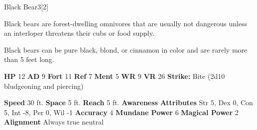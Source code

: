       
  \begin{monsubsection}{Black Bear}{3}[2]
    \vspace{-1em}\vspace{-1em}
    \vspace{0em}

    
        Black bears are forest-dwelling omnivores that are usually not dangerous unless an interloper threatens their cubs or food supply.

        Black bears can be pure black, blond, or cinnamon in color and are rarely more than 5 feet long.
      
    

    \begin{spellcontent}
      \begin{spelltargetinginfo}
        \pari \textbf{HP} 12 \monsep
          \textbf{AD} 9 \monsep
          \textbf{Fort} 11 \monsep
          \textbf{Ref} 7 \monsep
          \textbf{Ment} 5
        \pari \textbf{WR} 9 \monsep
        \textbf{VR} 26
        \pari \textbf{Strike:}
            Bite  (2d10 bludgeoning and piercing)
      \end{spelltargetinginfo}
    \end{spellcontent}
    \begin{monsterfooter}
      \pari \textbf{Speed} 30 ft. \monsep
        \textbf{Space} 5 ft. \monsep
        \textbf{Reach} 5 ft.
      \pari \textbf{Awareness} 
      \pari \textbf{Attributes}
        Str 5, Dex 0,
        Con 5, Int -8,
        Per 0, Wil -1
      \pari \textbf{Accuracy} 4 \monsep
        \textbf{Mundane Power} 6 \monsep
      \textbf{Magical Power} 2
      \pari \textbf{Alignment} Always true neutral
    \end{monsterfooter}
  \end{monsubsection}
  
